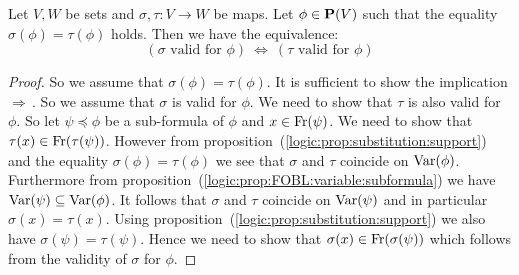 \begin{prop}\label{logic:prop:FOPL:validsub:image}
Let $V,W$ be sets and $\sigma,\tau:V\to W$ be maps. Let $\phi\in\mbox{${\bf P}(V)$}$
such that the equality $\sigma(\phi)=\tau(\phi)$ holds. Then we have
the equivalence:
    \[
    (\mbox{$\sigma$ valid for $\phi$})\ \Leftrightarrow\
    (\mbox{$\tau$ valid for $\phi$})
    \]
\end{prop}
\begin{proof}
So we assume that $\sigma(\phi)=\tau(\phi)$. It is sufficient to
show the implication $\Rightarrow$\,. So we assume that $\sigma$ is
valid for $\phi$. We need to show that $\tau$ is also valid for
$\phi$. So let $\psi\preceq\phi$ be a sub-formula of $\phi$ and
$x\in\mbox{\rm Fr}(\psi)$. We need to show that
$\tau(x)\in\mbox{\rm Fr}(\tau(\psi))$. However from
proposition~(\ref{logic:prop:substitution:support}) and the equality
$\sigma(\phi)=\tau(\phi)$ we see that $\sigma$ and $\tau$ coincide
on $\mbox{\rm Var}(\phi)$. Furthermore from
proposition~(\ref{logic:prop:FOBL:variable:subformula}) we have
$\mbox{\rm Var}(\psi)\subseteq\mbox{\rm Var}(\phi)$. It follows that $\sigma$ and $\tau$
coincide on $\mbox{\rm Var}(\psi)$ and in particular $\sigma(x)=\tau(x)$.
Using proposition~(\ref{logic:prop:substitution:support}) we also
have $\sigma(\psi)=\tau(\psi)$. Hence we need to show that
$\sigma(x)\in\mbox{\rm Fr}(\sigma(\psi))$ which follows from the validity of
$\sigma$ for $\phi$.
\end{proof}

